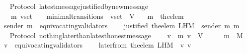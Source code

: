 \begin{isabellebody}
%
\isadelimproof
\ \ %
\endisadelimproof
%
\isatagproof
{}\isamarkupfalse%
%
\endisatagproof
{\isafoldproof}%
%
\isadelimproof
\isanewline
%
\endisadelimproof
\isanewline
\isanewline
\isanewline
{}\isamarkupfalse%
\ {\isacharparenleft}\ Protocol{\isacharparenright}\ latest{\isacharunderscore}message{\isacharunderscore}justified{\isacharunderscore}by{\isacharunderscore}new{\isacharunderscore}message\ {\isacharcolon}\isanewline
\ \ {\isachardoublequoteopen}{\isasymforall}\ {\isasymsigma}\ {\isasymsigma}{\isacharprime}\ m{\isacharprime}\ v{\isacharunderscore}set{\isachardot}\ {\isacharparenleft}{\isasymsigma}{\isacharcomma}\ {\isasymsigma}{\isacharprime}{\isacharparenright}\ {\isasymin}\ minimal{\isacharunderscore}transitions\ {\isasymand}\ v{\isacharunderscore}set\ {\isasymsubseteq}\ V\isanewline
\ \ {\isasymlongrightarrow}\ m{\isacharprime}\ {\isacharequal}\ the{\isacharunderscore}elem\ {\isacharparenleft}{\isasymsigma}{\isacharprime}\ {\isacharminus}\ {\isasymsigma}{\isacharparenright}\isanewline
\ \ {\isasymlongrightarrow}\ sender\ m{\isacharprime}\ {\isasymnotin}\ equivocating{\isacharunderscore}validators\ {\isasymsigma}{\isacharprime}\isanewline
\ \ {\isasymlongrightarrow}\ justified\ {\isacharparenleft}the{\isacharunderscore}elem\ {\isacharparenleft}L{\isacharunderscore}H{\isacharunderscore}M\ {\isasymsigma}\ {\isacharparenleft}sender\ m{\isacharprime}{\isacharparenright}{\isacharparenright}{\isacharparenright}\ m{\isacharprime}{\isachardoublequoteclose}\isanewline
%
\isadelimproof
\ \ %
\endisadelimproof
%
\isatagproof
{}\isamarkupfalse%
%
\endisatagproof
{\isafoldproof}%
%
\isadelimproof
\isanewline
%
\endisadelimproof
\isanewline
\isanewline
{}\isamarkupfalse%
\ {\isacharparenleft}\ Protocol{\isacharparenright}\ nothing{\isacharunderscore}later{\isacharunderscore}than{\isacharunderscore}latest{\isacharunderscore}honest{\isacharunderscore}message\ {\isacharcolon}\isanewline
\ \ {\isachardoublequoteopen}{\isasymforall}\ v\ {\isasymsigma}\ m{\isachardot}\ v\ {\isasymin}\ V\ {\isasymand}\ {\isasymsigma}\ {\isasymin}\ {\isasymSigma}\ {\isasymand}\ m\ {\isasymin}\ M\isanewline
\ \ {\isasymlongrightarrow}\ v\ {\isasymnotin}\ equivocating{\isacharunderscore}validators\ {\isasymsigma}{\isacharprime}\isanewline
\ \ {\isasymlongrightarrow}\ later{\isacharunderscore}from\ {\isacharparenleft}the{\isacharunderscore}elem\ {\isacharparenleft}L{\isacharunderscore}H{\isacharunderscore}M\ {\isasymsigma}\ v{\isacharparenright}{\isacharcomma}\ v{\isacharcomma}\ {\isasymsigma}{\isacharparenright}\ {\isacharequal}\ \ {\isasymemptyset}{\isachardoublequoteclose}\isanewline

\end{isabellebody}
